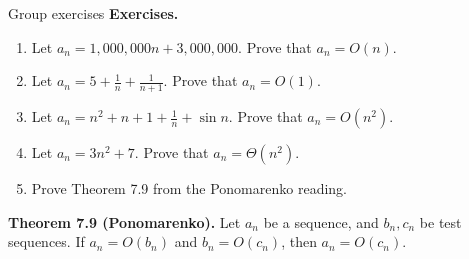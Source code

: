 \documentclass[10pt]{beamer}
\begin{document}
\begin{frame}{Group exercises}
\colorbox{green!30}{\textbf{Exercises.}}
\begin{enumerate}
	\item  Let $a_n = 1,000,000n + 3,000,000$. Prove that $a_n = O(n)$.
	\item Let $a_n = 5 + \frac{1}{n} + \frac{1}{n+1}$. Prove that $a_n = O(1)$.
	\item Let $a_n = n^2 + n + 1 + \frac{1}{n} + \sin n$. Prove that $a_n = O(n^2)$.
	\item Let $a_n = 3n^2 + 7$. Prove that $a_n = \Theta (n^2)$.
	\item Prove Theorem 7.9 from the Ponomarenko reading. 
\end{enumerate}

\vfill
\colorbox{red!30}{\textbf{Theorem 7.9 (Ponomarenko).}} Let $a_n$ be a sequence, and $b_n,c_n$ be test sequences.  If $a_n = O(b_n)$ and $b_n = O(c_n)$, then $a_n = O(c_n)$.
\end{frame}
\end{document}
